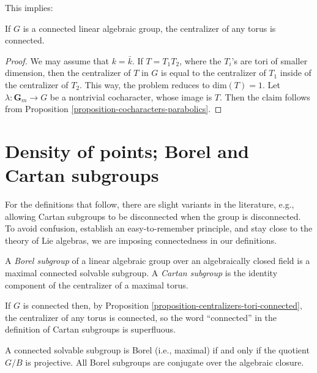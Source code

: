 This implies:

\begin{proposition}
\label{proposition-centralizers-tori-connected}
 If $G$ is a connected linear algebraic group, the centralizer of any torus is connected. 
\end{proposition}

\begin{proof}
 We may assume that $k=\bar k$. If $T=T_1T_2$, where the $T_i$'s are tori of smaller dimension, then the centralizer of $T$ in $G$ is equal to the centralizer of $T_1$ inside of the centralizer of $T_2$. This way, the problem reduces to $\text{dim}(T)=1$. Let $\lambda:\mathbf G_m\to G$ be a nontrivial cocharacter, whose image is $T$. Then the claim follows from Proposition \ref{proposition-cocharacters-parabolics}.
\end{proof}






\section{Density of points; Borel and Cartan subgroups}
\label{section-Cartan-Borel-group}

For the definitions that follow, there are slight variants in the literature, e.g., allowing Cartan subgroups to be disconnected when the group is disconnected. To avoid confusion, establish an easy-to-remember principle, and stay close to the theory of Lie algebras, we are imposing connectedness in our definitions.


\begin{definition}
\label{definition-Cartan-Borel-subgroup}
A {\it Borel subgroup} of a linear algebraic group over an algebraically closed field is a maximal connected solvable subgroup. A {\it Cartan subgroup} is the identity component of the centralizer of a maximal torus. 
\end{definition}

\begin{remark}
 \label{remark-Cartan-connected}
If $G$ is connected then, by Proposition \ref{proposition-centralizers-tori-connected}, the centralizer of any torus is connected, so the word ``connected'' in the definition of Cartan subgroups is superfluous.
\end{remark}



\begin{theorem}
\label{theorem-Borel-subgroups-conjugate}
A connected solvable subgroup is Borel (i.e., maximal) if and only if the quotient $G/B$ is projective. All Borel subgroups are conjugate over the algebraic closure.
\end{theorem}

